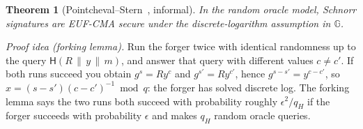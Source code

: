 \documentclass[11pt,a4paper]{article}
\newenvironment{formal}{\par\smallskip}{\par\smallskip}
\theoremstyle{definition}
\theoremstyle{plain}
\newtheorem{theorem}[definition]{Theorem}
\theoremstyle{remark}
\newcommand{\Hash}{\mathsf{H}}
\newcommand{\G}{\mathbb{G}}
\newcommand{\concat}{\,\|\,}
\begin{document}
\begin{formal}
\begin{theorem}[Pointcheval--Stern~\cite{PS96}, informal]
In the random oracle model, Schnorr signatures are EUF-CMA secure under the discrete-logarithm assumption in $\G$.
\end{theorem}
\emph{Proof idea (forking lemma).} Run the forger twice with identical randomness up to the query $\Hash(R\concat y\concat m)$, and answer that query with different values $c\neq c'$. If both runs succeed
you obtain $g^{s}=Ry^{c}$ and $g^{s'}=Ry^{c'}$, hence $g^{s-s'}=y^{c-c'}$, so $x=(s-s')(c-c')^{-1}\bmod q$: the forger has solved discrete log. The forking lemma says the two runs both succeed
with probability roughly $\epsilon^2/q_H$ if the forger succeeds with probability $\epsilon$ and makes $q_H$ random oracle queries.
\end{formal}
\end{document}
